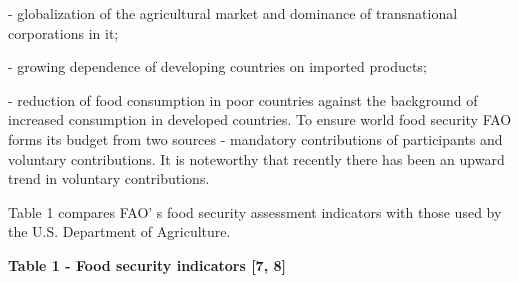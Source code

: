 {- globalization of the agricultural market and dominance of
transnational corporations in it;

- growing dependence of developing countries on imported products;

- reduction of food consumption in poor countries against the background
of increased consumption in developed countries. To ensure world food
security FAO forms its budget from two sources - mandatory contributions
of participants and voluntary contributions. It is noteworthy that
recently there has been an upward trend in voluntary contributions.

Table 1 compares FAO' s food security assessment
indicators with those used by the U.S. Department of Agriculture.

{\bfseries Table 1 - Food security indicators {[}7, 8{]}}

}
